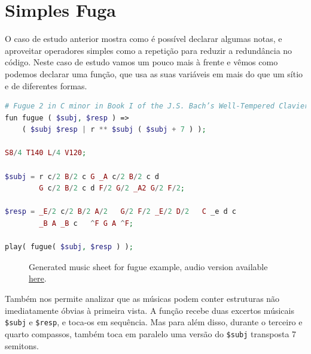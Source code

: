 \section{Simples Fuga}
O caso de estudo anterior mostra como é possível declarar algumas notas, e aproveitar operadores simples como a repetição para reduzir a redundância no código. Neste caso de estudo vamos um pouco mais à frente e vêmos como podemos declarar uma função, que usa as suas variáveis em mais do que um sítio e de diferentes formas.
\begin{lstlisting}[caption=Exemplo da declaração da estrutura e conteúdo de uma simples fuga de duas vozes,language=PHP]
# Fugue 2 in C minor in Book I of the J.S. Bach’s Well-Tempered Clavier
fun fugue ( $subj, $resp ) => 
    ( $subj $resp | r ** $subj ( $subj + 7 ) );

S8/4 T140 L/4 V120;

$subj = r c/2 B/2 c G _A c/2 B/2 c d
        G c/2 B/2 c d F/2 G/2 _A2 G/2 F/2;

$resp = _E/2 c/2 B/2 A/2   G/2 F/2 _E/2 D/2   C _e d c
        _B A _B c   ^F G A ^F;

play( fugue( $subj, $resp ) );
\end{lstlisting}

\begin{figure}[ht]
  \centering
  {%
  \setlength{\fboxsep}{0pt}%
  \setlength{\fboxrule}{0pt}%
  }%
  \caption{Generated music sheet for fugue example, audio version available \href{https://drive.google.com/file/d/1dIfvnhhKn73Vpp0W6ss6RLsv6PQ_HFTF/view}{\underline{here}}\protect\footnotemark.}
  \label{fig:fugue}
\end{figure}

Também nos permite analizar que as músicas podem conter estruturas não imediatamente óbvias à primeira vista. A função recebe duas excertos músicais \texttt{\$subj} e \texttt{\$resp}, e toca-os em sequência. Mas para além disso, durante o terceiro e quarto compassos, também toca em paralelo uma versão do \texttt{\$subj} transposta 7 semitons. 

